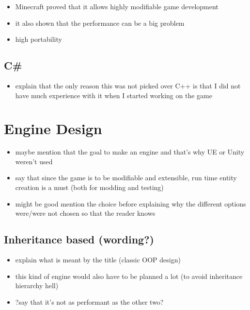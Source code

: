 \begin{itemize}
    \item Minecraft proved that it allows highly modifiable game
        development
    \item it also shown that the performance can be a big problem
    \item high portability
\end{itemize}

\subsection{C\#}

\begin{itemize}
    \item explain that the only reason this was not picked over C++
        is that I did not have much experience with it when I started
        working on the game
\end{itemize}

\section{Engine Design}

\begin{itemize}
    \item maybe mention that the goal to make an engine and that's why UE or Unity
        weren't used
    \item say that since the game is to be modifiable and extensible, run time
        entity creation is a must (both for modding and testing)
    \item might be good mention the choice before explaining why the different
        options were/were not chosen so that the reader knows
\end{itemize}

\subsection{Inheritance based (wording?)}

\begin{itemize}
    \item explain what is meant by the title (classic OOP design)
    \item this kind of engine would also have to be planned a lot (to avoid
        inheritance hierarchy hell)
    \item ?say that it's not as performant as the other two?
\end{itemize}

